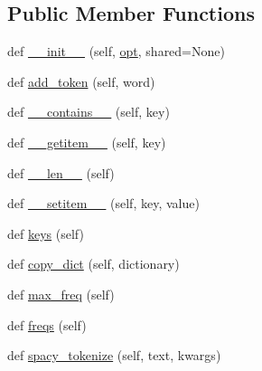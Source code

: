 \subsection*{Public Member Functions}
\begin{DoxyCompactItemize}
\item 
def \hyperlink{classparlai_1_1agents_1_1legacy__agents_1_1seq2seq_1_1dict__v1_1_1DictionaryAgent_ae3eb915e40f2b8dc1788d2fa9d59697c}{\+\_\+\+\_\+init\+\_\+\+\_\+} (self, \hyperlink{classparlai_1_1agents_1_1legacy__agents_1_1seq2seq_1_1dict__v1_1_1DictionaryAgent_a18f2b1e7b9b1f7e8f483dd7fd99f95ef}{opt}, shared=None)
\item 
def \hyperlink{classparlai_1_1agents_1_1legacy__agents_1_1seq2seq_1_1dict__v1_1_1DictionaryAgent_a35a084bb500ce45aa52786cdeddc49d7}{add\+\_\+token} (self, word)
\item 
def \hyperlink{classparlai_1_1agents_1_1legacy__agents_1_1seq2seq_1_1dict__v1_1_1DictionaryAgent_ae9ff07246d32352244a121ef76789970}{\+\_\+\+\_\+contains\+\_\+\+\_\+} (self, key)
\item 
def \hyperlink{classparlai_1_1agents_1_1legacy__agents_1_1seq2seq_1_1dict__v1_1_1DictionaryAgent_ab9926717ef35f03f16f1329f8ae8edc0}{\+\_\+\+\_\+getitem\+\_\+\+\_\+} (self, key)
\item 
def \hyperlink{classparlai_1_1agents_1_1legacy__agents_1_1seq2seq_1_1dict__v1_1_1DictionaryAgent_ad7ee199272d3dfdf934858d66270f806}{\+\_\+\+\_\+len\+\_\+\+\_\+} (self)
\item 
def \hyperlink{classparlai_1_1agents_1_1legacy__agents_1_1seq2seq_1_1dict__v1_1_1DictionaryAgent_ad9c574fe8296f3058148b6c4d91f7d09}{\+\_\+\+\_\+setitem\+\_\+\+\_\+} (self, key, value)
\item 
def \hyperlink{classparlai_1_1agents_1_1legacy__agents_1_1seq2seq_1_1dict__v1_1_1DictionaryAgent_a76ddad459524904d6b7d5e68a2a73834}{keys} (self)
\item 
def \hyperlink{classparlai_1_1agents_1_1legacy__agents_1_1seq2seq_1_1dict__v1_1_1DictionaryAgent_ace20feec59a305f29680ba6167eda2f6}{copy\+\_\+dict} (self, dictionary)
\item 
def \hyperlink{classparlai_1_1agents_1_1legacy__agents_1_1seq2seq_1_1dict__v1_1_1DictionaryAgent_a401e9c33a2b503efb53ec0c6cedc2f8e}{max\+\_\+freq} (self)
\item 
def \hyperlink{classparlai_1_1agents_1_1legacy__agents_1_1seq2seq_1_1dict__v1_1_1DictionaryAgent_a047820dad93a0e9af2aa649eb0a68e7c}{freqs} (self)
\item 
def \hyperlink{classparlai_1_1agents_1_1legacy__agents_1_1seq2seq_1_1dict__v1_1_1DictionaryAgent_a295893b8c3887c04200fcf2420ed33d2}{spacy\+\_\+tokenize} (self, text, kwargs)

\end{DoxyCompactItemize}
